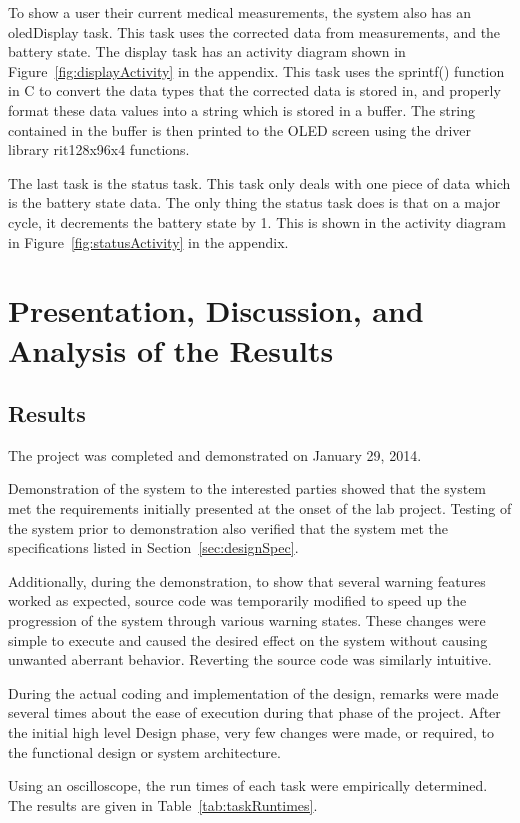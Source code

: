 \documentclass[12pt]{article} %
\begin{document}
To show a user their current medical measurements, the system also has an
oledDisplay task. This task uses the corrected data from measurements, and the
battery state. The display task has an activity diagram shown in
Figure~\ref{fig:displayActivity} in the appendix. This task uses the sprintf()
function in C to convert the data types that the corrected data is stored in,
and properly format these data values into a string which is stored in a
buffer. The string contained in the buffer is then printed to the OLED screen
using the driver library rit128x96x4 functions.

The last task is the status task. This task only deals with one piece of data
which is the battery state data. The only thing the status task does is that on
a major cycle, it decrements the battery state by 1. This is shown in the
activity diagram in Figure~\ref{fig:statusActivity} in the appendix.

\section{Presentation, Discussion, and Analysis of the Results}

\subsection{Results}
The project was completed and demonstrated on January 29, 2014.

Demonstration of the system to the interested parties showed that the system met the requirements initially presented at the onset of the lab project.
Testing of the system prior to demonstration also verified that the system met the specifications listed in Section~\ref{sec:designSpec}.

Additionally, during the demonstration, to show that several warning features worked as expected, source code was temporarily modified to speed up the progression of the system through various warning states. These changes were simple to execute and caused the desired effect on the system without causing unwanted aberrant behavior. Reverting the source code was similarly intuitive.

During the actual coding and implementation of the design, remarks were made several times about the ease of execution during that phase of the project. After the initial high level Design phase, very few changes were made, or required, to the functional design or system architecture.

Using an oscilloscope, the run times of each task were empirically determined. The results are given in Table~\ref{tab:taskRuntimes}.
\end{document}
